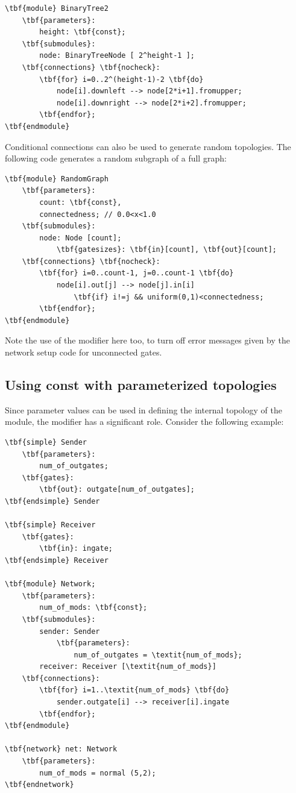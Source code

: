 \begin{Verbatim}[commandchars=\\\{\}]
\tbf{module} BinaryTree2
    \tbf{parameters}:
        height: \tbf{const};
    \tbf{submodules}:
        node: BinaryTreeNode [ 2^height-1 ];
    \tbf{connections} \tbf{nocheck}:
        \tbf{for} i=0..2^(height-1)-2 \tbf{do}
            node[i].downleft --> node[2*i+1].fromupper;
            node[i].downright --> node[2*i+2].fromupper;
        \tbf{endfor};
\tbf{endmodule}
\end{Verbatim}




Conditional connections can also be used to generate random
topologies.  The following code generates a
random subgraph of a full graph:


\begin{Verbatim}[commandchars=\\\{\}]
\tbf{module} RandomGraph
    \tbf{parameters}:
        count: \tbf{const},
        connectedness; // 0.0<x<1.0
    \tbf{submodules}:
        node: Node [count];
            \tbf{gatesizes}: \tbf{in}[count], \tbf{out}[count];
    \tbf{connections} \tbf{nocheck}:
        \tbf{for} i=0..count-1, j=0..count-1 \tbf{do}
            node[i].out[j] --> node[j].in[i]
                \tbf{if} i!=j && uniform(0,1)<connectedness;
        \tbf{endfor};
\tbf{endmodule}
\end{Verbatim}

Note the use of the  modifier
here too, to turn off error messages given by the network setup code
for unconnected gates.


\subsection{Using const with parameterized topologies}


Since parameter values can be used in defining the internal topology
of the module, the  modifier has a
significant role. Consider the following example:


\begin{Verbatim}[commandchars=\\\{\}]
\tbf{simple} Sender
    \tbf{parameters}:
        num_of_outgates;
    \tbf{gates}:
        \tbf{out}: outgate[num_of_outgates];
\tbf{endsimple} Sender

\tbf{simple} Receiver
    \tbf{gates}:
        \tbf{in}: ingate;
\tbf{endsimple} Receiver

\tbf{module} Network;
    \tbf{parameters}:
        num_of_mods: \tbf{const};
    \tbf{submodules}:
        sender: Sender
            \tbf{parameters}:
                num_of_outgates = \textit{num_of_mods};
        receiver: Receiver [\textit{num_of_mods}]
    \tbf{connections}:
        \tbf{for} i=1..\textit{num_of_mods} \tbf{do}
            sender.outgate[i] --> receiver[i].ingate
        \tbf{endfor};
\tbf{endmodule}

\tbf{network} net: Network
    \tbf{parameters}:
        num_of_mods = normal (5,2);
\tbf{endnetwork}
\end{Verbatim}


